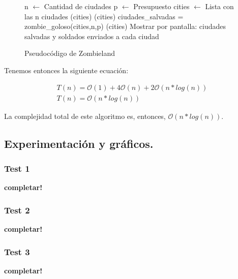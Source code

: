 \begin{figure}[!ht]
\begin{codebox}
\li n $\leftarrow$ Cantidad de ciudades
\li p $\leftarrow$ Presupuesto
\li cities $\leftarrow$ Lista con las n ciudades
(cities)
(cities)
\li ciudades_salvadas = {\sc zombie_goloso}(cities,n,p)
(cities)
\li Mostrar por pantalla: ciudades salvadas y soldados enviados a cada ciudad
\end{codebox}
\caption{Pseudocódigo de Zombieland}\label{code:zombieland}
\end{figure}
\FloatBarrier

Tenemos entonces la siguiente ecuación:

\begin{equation*}
\begin{array}{l}
T(n) = \mathcal{O}(1) + 4\mathcal{O}(n) + 2\mathcal{O}(n*log(n))\\
T(n) = \mathcal{O}(n*log(n))
\end{array}
\end{equation*}

La complejidad total de este algoritmo es, entonces, $\mathcal{O}(n*log(n))$.


\newpage
\subsection{Experimentación y gráficos.}

\vspace*{0.3cm}

\subsubsection{Test 1}

\vspace*{0.3cm}

\textbf{completar!}


\newpage
\subsubsection{Test 2}

\vspace*{0.3cm}

\textbf{completar!}


\newpage
\subsubsection{Test 3}

\vspace*{0.3cm}

\textbf{completar!}
